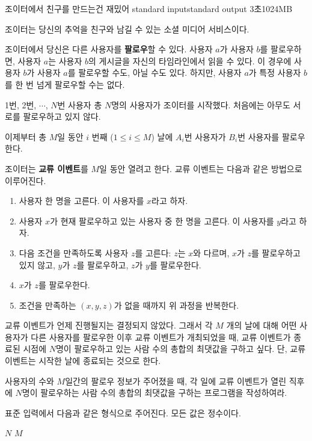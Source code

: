 \begin{problem}{조이터에서 친구를 만드는건 재밌어}
	{standard input}{standard output}
	{3초}{1024MB}{}
	
	조이터는 당신의 추억을 친구와 남길 수 있는 소셜 미디어 서비스이다.
	
	조이터에서 당신은 다른 사용자를 \textbf{팔로우}할 수 있다. 사용자 $a$가 사용자 $b$를 팔로우하면, 사용자 $a$는 사용자 $b$의 게시글을 자신의 타임라인에서 읽을 수 있다. 이 경우에 사용자 $b$가 사용자 $a$를 팔로우할 수도, 아닐 수도 있다. 하지만, 사용자 $a$가 특정 사용자 $b$를 한 번 넘게 팔로우할 수는 없다.
	
	1번, 2번, $\cdots$, $N$번 사용자 총 $N$명의 사용자가 조이터를 시작했다. 처음에는 아무도 서로를 팔로우하고 있지 않다.
	
	이제부터 총 $M$일 동안 $i$ 번째 ($1 \le i \le M$) 날에 $A_i$번 사용자가 $B_i$번 사용자를 팔로우한다. 
	
	조이터는 \textbf{교류 이벤트}를 $M$일 동안 열려고 한다. 교류 이벤트는 다음과 같은 방법으로 이루어진다.
	
	\begin{enumerate}
		\item 사용자 한 명을 고른다. 이 사용자를 $x$라고 하자.
		\item 사용자 $x$가 현재 팔로우하고 있는 사용자 중 한 명을 고른다. 이 사용자를 $y$라고 하자.
		\item 다음 조건을 만족하도록 사용자 $z$를 고른다: $z$는 $x$와 다르며, $x$가 $z$를 팔로우하고 있지 않고, $y$가 $z$를 팔로우하고, $z$가 $y$를 팔로우한다.
		\item $x$가 $z$를 팔로우한다.
		\item 조건을 만족하는 $(x, y, z)$가 없을 때까지 위 과정을 반복한다.
	\end{enumerate}
	
	교류 이벤트가 언제 진행될지는 결정되지 않았다. 그래서 각 $M$ 개의 날에 대해 어떤 사용자가 다른 사용자를 팔로우한 이후 교류 이벤트가 개최되었을 때, 교류 이벤트가 종료된 시점에 $N$명이 팔로우하고 있는 사람 수의 총합의 최댓값을 구하고 싶다. 단, 교류 이벤트는 시작한 날에 종료되는 것으로 한다.
	
	사용자의 수와 $M$일간의 팔로우 정보가 주어졌을 때, 각 일에 교류 이벤트가 열린 직후에 $N$명이 팔로우하는 사람 수의 총합의 최댓값을 구하는 프로그램을 작성하여라.
	
	
\InputFile

표준 입력에서 다음과 같은 형식으로 주어진다. 모든 값은 정수이다.

$N$ $M$


\end{problem}
